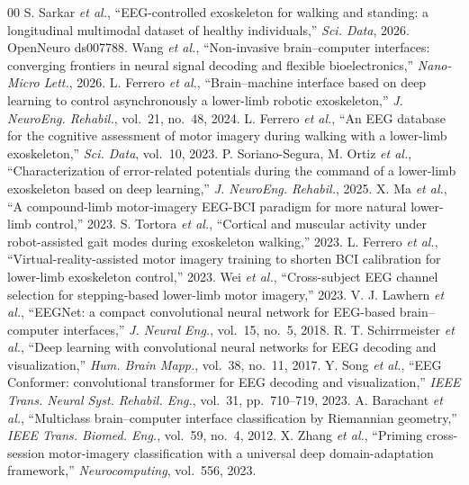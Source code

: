 \documentclass[conference]{IEEEtran}
\begin{document}
\begin{thebibliography}{00}
 S. Sarkar \emph{et al.}, ``EEG-controlled exoskeleton for
walking and standing: a longitudinal multimodal dataset of healthy individuals,''
\emph{Sci. Data}, 2026. OpenNeuro ds007788.
 Wang \emph{et al.}, ``Non-invasive brain--computer interfaces:
converging frontiers in neural signal decoding and flexible bioelectronics,''
\emph{Nano-Micro Lett.}, 2026.
 L. Ferrero \emph{et al.}, ``Brain--machine interface based on
deep learning to control asynchronously a lower-limb robotic exoskeleton,''
\emph{J. NeuroEng. Rehabil.}, vol.~21, no.~48, 2024.
 L. Ferrero \emph{et al.}, ``An EEG database for the cognitive
assessment of motor imagery during walking with a lower-limb exoskeleton,''
\emph{Sci. Data}, vol.~10, 2023.
 P. Soriano-Segura, M. Ortiz \emph{et al.}, ``Characterization
of error-related potentials during the command of a lower-limb exoskeleton based on
deep learning,'' \emph{J. NeuroEng. Rehabil.}, 2025.
 X. Ma \emph{et al.}, ``A compound-limb motor-imagery EEG-BCI
paradigm for more natural lower-limb control,'' 2023.
 S. Tortora \emph{et al.}, ``Cortical and muscular activity
under robot-assisted gait modes during exoskeleton walking,'' 2023.
 L. Ferrero \emph{et al.}, ``Virtual-reality-assisted motor
imagery training to shorten BCI calibration for lower-limb exoskeleton control,''
2023.
 Wei \emph{et al.}, ``Cross-subject EEG channel selection for
stepping-based lower-limb motor imagery,'' 2023.
 V. J. Lawhern \emph{et al.}, ``EEGNet: a compact convolutional
neural network for EEG-based brain--computer interfaces,'' \emph{J. Neural Eng.},
vol.~15, no.~5, 2018.
 R. T. Schirrmeister \emph{et al.}, ``Deep learning with
convolutional neural networks for EEG decoding and visualization,'' \emph{Hum. Brain
Mapp.}, vol.~38, no.~11, 2017.
 Y. Song \emph{et al.}, ``EEG Conformer: convolutional transformer
for EEG decoding and visualization,'' \emph{IEEE Trans. Neural Syst. Rehabil. Eng.},
vol.~31, pp.~710--719, 2023.
 A. Barachant \emph{et al.}, ``Multiclass brain--computer
interface classification by Riemannian geometry,'' \emph{IEEE Trans. Biomed. Eng.},
vol.~59, no.~4, 2012.
 X. Zhang \emph{et al.}, ``Priming cross-session motor-imagery
classification with a universal deep domain-adaptation framework,''
\emph{Neurocomputing}, vol.~556, 2023.

\end{thebibliography}
\end{document}
